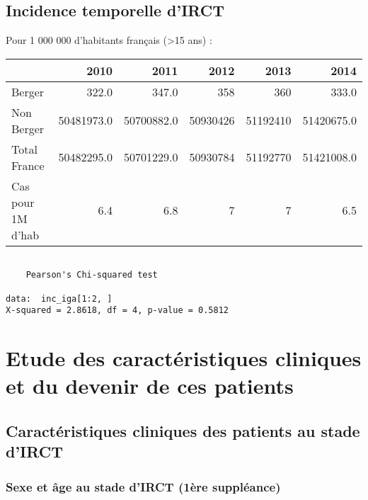 \documentclass[11pt,a4paper]{article}\usepackage[]{graphicx}\usepackage[]{color}
\makeatletter
\newenvironment{kframe}{%
 \def\at@end@of@kframe{}%
 \ifinner\ifhmode%
  \def\at@end@of@kframe{\end{minipage}}%
  \begin{minipage}{\columnwidth}%
 \fi\fi%
 \def\FrameCommand##1{\hskip\@totalleftmargin \hskip-\fboxsep
 \colorbox{shadecolor}{##1}\hskip-\fboxsep
     \hskip-\linewidth \hskip-\@totalleftmargin \hskip\columnwidth}%
 \MakeFramed {\advance\hsize-\width
   \@totalleftmargin\z@ \linewidth\hsize
   \@setminipage}}%
 {\par\unskip\endMakeFramed%
 \at@end@of@kframe}
\newenvironment{knitrout}{}{} %
\makeatother
\begin{document}
  \subsection{Incidence temporelle d'IRCT}

Pour 1 000 000 d'habitants français (\textgreater 15 ans) :

\begin{table}[H]
\centering
\begin{tabular}{lrrrrr}
  \hline
 & 2010 & 2011 & 2012 & 2013 & 2014 \\ 
  \hline
Berger & 322.0 & 347.0 & 358 & 360 & 333.0 \\ 
  Non Berger & 50481973.0 & 50700882.0 & 50930426 & 51192410 & 51420675.0 \\ 
  Total France & 50482295.0 & 50701229.0 & 50930784 & 51192770 & 51421008.0 \\ 
  Cas pour 1M d'hab & 6.4 & 6.8 & 7 & 7 & 6.5 \\ 
   \hline
\end{tabular}
\end{table}


\begin{knitrout}
\color{fgcolor}\begin{kframe}
\begin{verbatim}

	Pearson's Chi-squared test

data:  inc_iga[1:2, ]
X-squared = 2.8618, df = 4, p-value = 0.5812
\end{verbatim}
\end{kframe}
\end{knitrout}

\section{Etude des caractéristiques cliniques et du devenir de ces patients}

  \subsection{Caractéristiques cliniques des patients au stade d’IRCT}
  
    \subsubsection{Sexe et âge au stade d’IRCT (1ère suppléance)}
\end{document}

